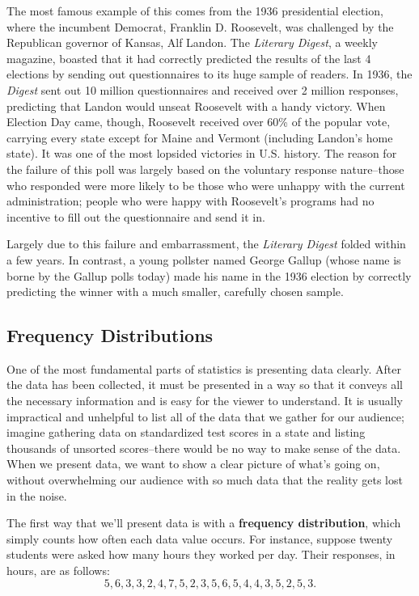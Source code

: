 The most famous example of this comes from the 1936 presidential election, where the incumbent Democrat, Franklin D. Roosevelt, was challenged by the Republican governor of Kansas, Alf Landon.  The \textit{Literary Digest}, a weekly magazine, boasted that it had correctly predicted the results of the last 4 elections by sending out questionnaires to its huge sample of readers.  In 1936, the \textit{Digest} sent out 10 million questionnaires and received over 2 million responses, predicting that Landon would unseat Roosevelt with a handy victory.  When Election Day came, though, Roosevelt received over 60\% of the popular vote, carrying every state except for Maine and Vermont (including Landon's home state).  It was one of the most lopsided victories in U.S. history.  The reason for the failure of this poll was largely based on the voluntary response nature--those who responded were more likely to be those who were unhappy with the current administration; people who were happy with Roosevelt's programs had no incentive to fill out the questionnaire and send it in.

Largely due to this failure and embarrassment, the \textit{Literary Digest} folded within a few years.  In contrast, a young pollster named George Gallup (whose name is borne by the Gallup polls today) made his name in the 1936 election by correctly predicting the winner with a much smaller, carefully chosen sample.

\subsection{Frequency Distributions}

One of the most fundamental parts of statistics is presenting data clearly. After the data has been collected, it must be presented in a way so that it conveys all the necessary information and is easy for the viewer to understand. It is usually impractical and unhelpful to list all of the data that we gather for our audience; imagine gathering data on standardized test scores in a state and listing thousands of unsorted scores--there would be no way to make sense of the data.  When we present data, we want to show a clear picture of what's going on, without overwhelming our audience with so much data that the reality gets lost in the noise.


The first way that we'll present data is with a \textbf{frequency distribution}, which simply counts how often each data value occurs.  For instance, suppose twenty students were asked how many hours they worked per day. Their responses, in hours, are as follows: \[5, 6, 3, 3, 2, 4, 7, 5, 2, 3, 5, 6, 5, 4, 4, 3, 5, 2, 5, 3.\]
\pagebreak

